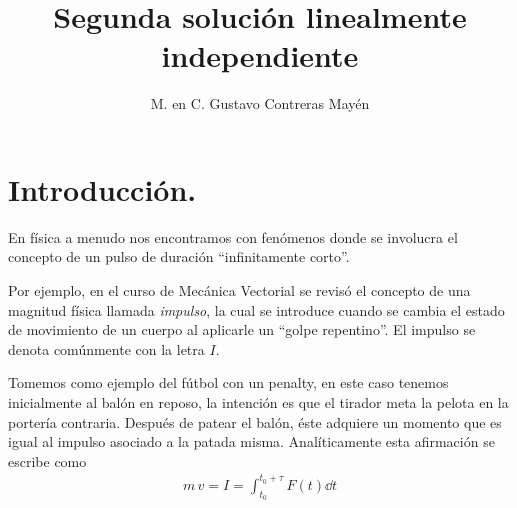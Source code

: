 
\title{Segunda solución linealmente independiente} \vspace{-3ex}
\author{M. en C. Gustavo Contreras Mayén}
\date{ }

\vspace{-4cm}
\maketitle
\fontsize{14}{14}\selectfont
\tableofcontents
\newpage

\section{Introducción.}

En física a menudo nos encontramos con fenómenos donde se involucra el concepto de un pulso de duración \enquote{infinitamente corto}.
\par
Por ejemplo, en el curso de Mecánica Vectorial se revisó el concepto de una magnitud física llamada \emph{impulso}, la cual se introduce cuando se cambia el estado de movimiento de un cuerpo al aplicarle un \enquote{golpe repentino}. El impulso se denota comúnmente con la letra $I$.
\par
Tomemos como ejemplo del fútbol con un penalty, en este caso tenemos inicialmente al balón en reposo, la intención es que el tirador meta la pelota en la portería contraria. Después de patear el balón, éste adquiere un momento que es igual al impulso asociado a la patada misma. Analíticamente esta afirmación se escribe como
\begin{align*}
m \, v = I = \int_{t_{0}}^{t_{0} + \tau} F(t) \dd{t}
\end{align*}

